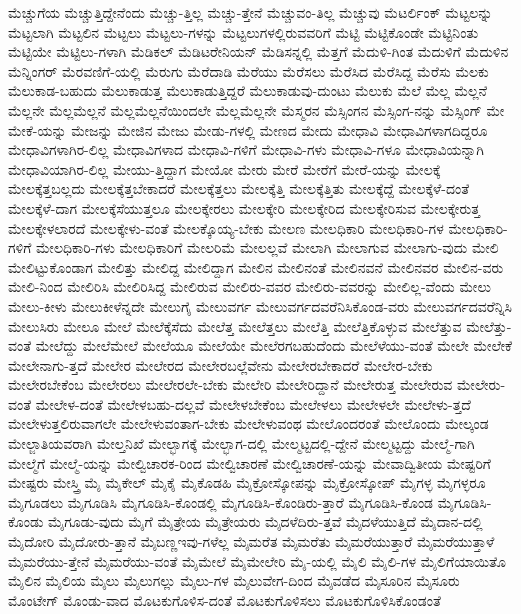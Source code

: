 {ಮೆಚ್ಚುಗೆಯ
ಮೆಚ್ಚುತ್ತಿದ್ದೇನೆಂದು
ಮೆಚ್ಚು-ತ್ತಿಲ್ಲ
ಮೆಚ್ಚು-ತ್ತೇನೆ
ಮೆಚ್ಚುವಂ-ತಿಲ್ಲ
ಮೆಚ್ಚುವು
ಮೆಟರ್ಲಿಂಕ್
ಮೆಟ್ಟಲನ್ನು
ಮೆಟ್ಟಲಾಗಿ
ಮೆಟ್ಟಲಿನ
ಮೆಟ್ಟಲು
ಮೆಟ್ಟಲು-ಗಳನ್ನು
ಮೆಟ್ಟಲುಗಳಲ್ಲಿರುವವರಿಗೆ
ಮೆಟ್ಟಿ
ಮೆಟ್ಟಿಕೊಂಡೇ
ಮೆಟ್ಟಿನಿಂತು
ಮೆಟ್ಟಿಯೇ
ಮೆಟ್ಟಿಲು-ಗಳಾಗಿ
ಮೆಡಿಕಲ್
ಮೆಡಿಟರೇನಿಯನ್
ಮೆಡಿಸನ್ನಲ್ಲಿ
ಮೆತ್ತಗೆ
ಮೆದುಳಿ-ಗಿಂತ
ಮೆದುಳಿಗೆ
ಮೆದುಳಿನ
ಮೆನ್ನಿಂಗರ್
ಮೆರವಣಿಗೆ-ಯಲ್ಲಿ
ಮೆರುಗು
ಮೆರೆದಾಡಿ
ಮೆರೆಯು
ಮೆರೆಸಲು
ಮೆರೆಸಿದ
ಮೆರೆಸಿದ್ದ
ಮೆರೆಸು
ಮೆಲಕು
ಮೆಲುಕಾಡ-ಬಹುದು
ಮೆಲುಕಾಡುತ್ತ
ಮೆಲುಕಾಡುತ್ತಿದ್ದರೆ
ಮೆಲುಕಾಡುವು-ದುಂಟು
ಮೆಲುಕು
ಮೆಲೆ
ಮೆಲ್ಲ
ಮೆಲ್ಲನೆ
ಮೆಲ್ಲನೇ
ಮೆಲ್ಲಮೆಲ್ಲನೆ
ಮೆಲ್ಲಮೆಲ್ಲನೆಯಿಂದಲೇ
ಮೆಲ್ಲಮೆಲ್ಲನೇ
ಮೆಸ್ಮರನ
ಮೆಸ್ಸಿಂಗನ
ಮೆಸ್ಸಿಂಗ-ನನ್ನು
ಮೆಸ್ಸಿಂಗ್
ಮೇ
ಮೇಕೆ-ಯನ್ನು
ಮೇಜನ್ನು
ಮೇಜಿನ
ಮೇಜು
ಮೇಡು-ಗಳಲ್ಲಿ
ಮೇಣದ
ಮೇದು
ಮೇಧಾವಿ
ಮೇಧಾವಿಗಳಾಗದಿದ್ದರೂ
ಮೇಧಾವಿಗಳಾಗಿರ-ಲಿಲ್ಲ
ಮೇಧಾವಿಗಳಾದ
ಮೇಧಾವಿ-ಗಳಿಗೆ
ಮೇಧಾವಿ-ಗಳು
ಮೇಧಾವಿ-ಗಳೂ
ಮೇಧಾವಿಯನ್ನಾಗಿ
ಮೇಧಾವಿಯಾಗಿರ-ಲಿಲ್ಲ
ಮೇಯು-ತ್ತಿದ್ದಾಗ
ಮೇಯೋ
ಮೇರು
ಮೇರೆ
ಮೇರೆಗೆ
ಮೇರೆ-ಯನ್ನು
ಮೇಲಕ್ಕೆ
ಮೇಲಕ್ಕೆತ್ತಬಲ್ಲದು
ಮೇಲಕ್ಕೆತ್ತಬೇಕಾದರೆ
ಮೇಲಕ್ಕೆತ್ತಲು
ಮೇಲಕ್ಕೆತ್ತಿ
ಮೇಲಕ್ಕೆತ್ತಿತು
ಮೇಲಕ್ಕೆದ್ದೆ
ಮೇಲಕ್ಕೆಳೆ-ದಂತೆ
ಮೇಲಕ್ಕೆಳೆ-ದಾಗ
ಮೇಲಕ್ಕೆಸೆಯುತ್ತಲೂ
ಮೇಲಕ್ಕೇರಲು
ಮೇಲಕ್ಕೇರಿ
ಮೇಲಕ್ಕೇರಿದ
ಮೇಲಕ್ಕೇರಿಸುವ
ಮೇಲಕ್ಕೇರುತ್ತ
ಮೇಲಕ್ಕೇಳಲಾರದೆ
ಮೇಲಕ್ಕೇಳು-ವಂತೆ
ಮೇಲಕ್ಕೊಯ್ಯ-ಬೇಕು
ಮೇಲಣ
ಮೇಲಧಿಕಾರಿ
ಮೇಲಧಿಕಾರಿ-ಗಳ
ಮೇಲಧಿಕಾರಿ-ಗಳಿಗೆ
ಮೇಲಧಿಕಾರಿ-ಗಳು
ಮೇಲಧಿಕಾರಿಗೆ
ಮೇಲರಿಮೆ
ಮೇಲಲ್ಲವೆ
ಮೇಲಾಗಿ
ಮೇಲಾಗುವ
ಮೇಲಾಗು-ವುದು
ಮೇಲಿ
ಮೇಲಿಟ್ಟುಕೊಂಡಾಗ
ಮೇಲಿತ್ತು
ಮೇಲಿದ್ದ
ಮೇಲಿದ್ದಾಗ
ಮೇಲಿನ
ಮೇಲಿನಂತೆ
ಮೇಲಿನವನೆ
ಮೇಲಿನವರ
ಮೇಲಿನ-ವರು
ಮೇಲಿ-ನಿಂದ
ಮೇಲಿರಿಸಿ
ಮೇಲಿರಿಸಿದ್ದ
ಮೇಲಿರುವ
ಮೇಲಿರು-ವವರ
ಮೇಲಿರು-ವವರನ್ನು
ಮೇಲಿಲ್ಲ-ವೆಂದು
ಮೇಲು
ಮೇಲು-ಕೀಳು
ಮೇಲುಕೀಳೆನ್ನದೇ
ಮೇಲುಗೈ
ಮೇಲುವರ್ಗ
ಮೇಲುವರ್ಗದವರೆನಿಸಿಕೊಂಡ-ವರು
ಮೇಲುವರ್ಗದವರೆನ್ನಿಸಿ
ಮೇಲುಸಿರು
ಮೇಲೂ
ಮೇಲೆ
ಮೇಲೆಕ್ಕೆಸೆದು
ಮೇಲೆತ್ತ
ಮೇಲೆತ್ತಲು
ಮೇಲೆತ್ತಿ
ಮೇಲೆತ್ತಿಕೊಳ್ಳುವ
ಮೇಲೆತ್ತುವ
ಮೇಲೆತ್ತು-ವಂತೆ
ಮೇಲೆದ್ದು
ಮೇಲೆಮೇಲೆ
ಮೇಲೆಯೂ
ಮೇಲೆಯೇ
ಮೇಲೆರಗಬಹುದೆಂದು
ಮೇಲೆಳೆಯು-ವಂತೆ
ಮೇಲೇ
ಮೇಲೇಕೆ
ಮೇಲೇನಾಗು-ತ್ತದೆ
ಮೇಲೇರ
ಮೇಲೇರದ
ಮೇಲೇರಬಲ್ಲೆವೇನು
ಮೇಲೇರಬೇಕಾದರೆ
ಮೇಲೇರ-ಬೇಕು
ಮೇಲೇರಬೇಕೆಂಬ
ಮೇಲೇರಲು
ಮೇಲೇರಲೇ-ಬೇಕು
ಮೇಲೇರಿ
ಮೇಲೇರಿದ್ದಾನೆ
ಮೇಲೇರುತ್ತ
ಮೇಲೇರುವ
ಮೇಲೇರು-ವಂತೆ
ಮೇಲೇಳ-ದಂತೆ
ಮೇಲೇಳಬಹು-ದಲ್ಲವೆ
ಮೇಲೇಳಬೇಕೆಂಬ
ಮೇಲೇಳಲು
ಮೇಲೇಳಲೇ
ಮೇಲೇಳು-ತ್ತದೆ
ಮೇಲೇಳುತ್ತಲಿರುವಾಗಲೇ
ಮೇಲೇಳುವಂತಾಗ-ಬೇಕು
ಮೇಲೇಳುವಂಥ
ಮೇಲೊಂದರಂತೆ
ಮೇಲೊಂದು
ಮೇಲ್ಕಂಡ
ಮೇಲ್ಜಾತಿಯವರಾಗಿ
ಮೇಲ್ತನಿಖೆ
ಮೇಲ್ಭಾಗಕ್ಕೆ
ಮೇಲ್ಭಾಗ-ದಲ್ಲಿ
ಮೇಲ್ಮಟ್ಟದಲ್ಲಿ-ದ್ದೇನೆ
ಮೇಲ್ಮಟ್ಟದ್ದು
ಮೇಲ್ಮೆ-ಗಾಗಿ
ಮೇಲ್ಮೆಗೆ
ಮೇಲ್ಮೆ-ಯನ್ನು
ಮೇಲ್ವಿಚಾರಕ-ರಿಂದ
ಮೇಲ್ವಿಚಾರಣೆ
ಮೇಲ್ವಿಚಾರಣೆ-ಯನ್ನು
ಮೇವಾದ್ವಿತೀಯ
ಮೇಷ್ಟರಿಗೆ
ಮೇಷ್ಟರು
ಮೇಸ್ತ್ರಿ
ಮೈ
ಮೈಕೇಲ್
ಮೈಕೈ
ಮೈಕೊಡಹಿ
ಮೈಕ್ರೋಸ್ಕೋಪನ್ನು
ಮೈಕ್ರೋಸ್ಕೋಪ್
ಮೈಗಳ್ಳ
ಮೈಗಳ್ಳರೂ
ಮೈಗೂಡಲು
ಮೈಗೂಡಿಸಿ
ಮೈಗೂಡಿಸಿ-ಕೊಂಡಲ್ಲಿ
ಮೈಗೂಡಿಸಿ-ಕೊಂಡಿರು-ತ್ತಾರೆ
ಮೈಗೂಡಿಸಿ-ಕೊಂಡ
ಮೈಗೂಡಿಸಿ-ಕೊಂಡು
ಮೈಗೂಡು-ವುದು
ಮೈಗೆ
ಮೈತ್ರೇಯ
ಮೈತ್ರೇಯರು
ಮೈದಳೆದಿರು-ತ್ತವೆ
ಮೈದಳೆಯುತ್ತಿದೆ
ಮೈದಾನ-ದಲ್ಲಿ
ಮೈದೋರಿ
ಮೈದೋರು-ತ್ತಾನೆ
ಮೈಬಣ್ಣಇವು-ಗಳೆಲ್ಲ
ಮೈಮರೆತ
ಮೈಮರೆತು
ಮೈಮರೆಯುತ್ತಾರೆ
ಮೈಮರೆಯುತ್ತಾಳೆ
ಮೈಮರೆಯು-ತ್ತೇನೆ
ಮೈಮರೆಯು-ವಂತೆ
ಮೈಮೇಲೆ
ಮೈಮೇಲೇರಿ
ಮೈ-ಯಲ್ಲಿ
ಮೈಲಿ
ಮೈಲಿ-ಗಳ
ಮೈಲಿಗೆಯಾಯಿತೊ
ಮೈಲಿನ
ಮೈಲಿಯ
ಮೈಲು
ಮೈಲುಗಲ್ಲು
ಮೈಲು-ಗಳ
ಮೈಲುವೇಗ-ದಿಂದ
ಮೈವಡೆದ
ಮೈಸೂರಿನ
ಮೈಸೂರು
ಮೊಂಟೇಗ್
ಮೊಂಡು-ವಾದ
ಮೊಟಕುಗೊಳಿಸ-ದಂತೆ
ಮೊಟಕುಗೊಳಿಸಲು
ಮೊಟಕುಗೊಳಿಸಿಕೊಂಡಂತೆ
}
